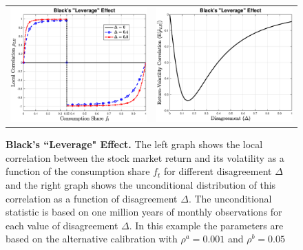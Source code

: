 \begin{figure}[H]%
\centering
\begin{tabular}{cc}
\includegraphics[width=.4\textwidth]{figures/BlackLeverageEffect2f.eps} &  
\includegraphics[width=.4\textwidth]{figures/BlackLeverageEffect2DEL.eps} \\ 
\end{tabular}
\caption{\textbf{Black's ``Leverage" Effect.}  \footnotesize{The left graph shows the local correlation between the stock market return and its volatility as a function of the consumption share $f_t$ for different disagreement $\Delta$ and the right graph shows the unconditional distribution of this correlation as a function of disagreement $\Delta$.   The unconditional statistic is based on one million years of monthly observations for each value of disagreement $\Delta$. In this example the parameters are based on the alternative calibration with $\rho^a = 0.001$ and $\rho^b = 0.05$}} 
\label{fig:BlackLeverageEffect} 
\end{figure}


